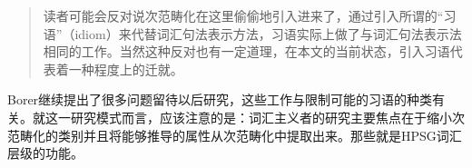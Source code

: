 \begin{exe}
\begin{xlist}[iv.]
\begin{exe}
\begin{xlist}[iv.]
\begin{quote}
读者可能会反对说次范畴化在这里偷偷地引入进来了，通过引入所谓的“习语”（idiom）来代替词汇句法表示方法，习语实际上做了与词汇句法表示法相同的工作。当然这种反对也有一定道理，在本文的当前状态，引入习语代表着一种程度上的迁就。
  \\ \citep[Vol. II, p.\,354--355]{Borer2005a-u}
\end{quote}
Borer继续提出了很多问题留待以后研究，这些工作与限制可能的习语的种类有关。就这一研究模式而言，应该注意的是：词汇主义者的研究主要焦点在于缩小次范畴化的类别并且将能够推导的属性从次范畴化中提取出来。那些就是HPSG词汇层级的功能。
%


\end{xlist}
\end{exe}
\end{xlist}
\end{exe}
